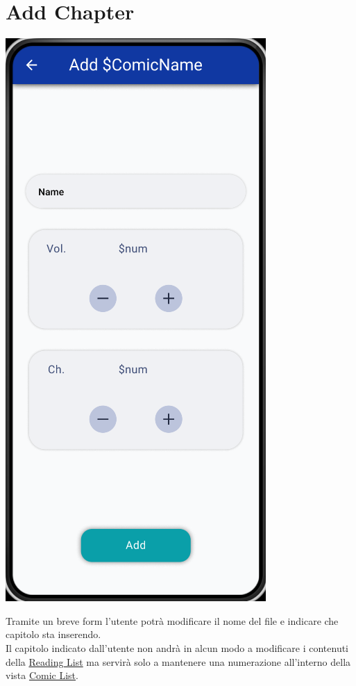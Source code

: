 \documentclass{report}
\begin{document}
\section{Add Chapter}\label{sec:add_chapter}

\begin{center}
  \includegraphics[scale=0.4]{add_chapter.png}
\end{center}

Tramite un breve form l'utente potrà modificare il nome del file e indicare che capitolo sta inserendo.\\
Il capitolo indicato dall'utente non andrà in alcun modo a modificare i contenuti della \hyperref[sec:reading_list]{Reading List} ma servirà solo a mantenere una numerazione all'interno della vista \hyperref[sec:comic_list]{Comic List}.
\end{document}
